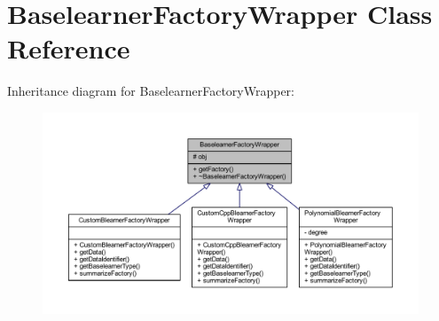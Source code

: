 \hypertarget{class_baselearner_factory_wrapper}{}\section{Baselearner\+Factory\+Wrapper Class Reference}
\label{class_baselearner_factory_wrapper}


Inheritance diagram for Baselearner\+Factory\+Wrapper\+:\nopagebreak
\begin{figure}[H]
\begin{center}
\leavevmode
\includegraphics[width=350pt]{class_baselearner_factory_wrapper__inherit__graph}
\end{center}
\end{figure}


